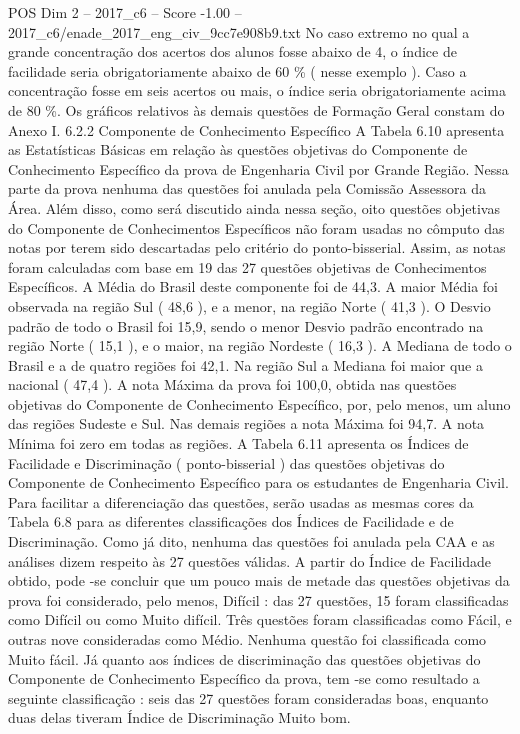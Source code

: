\begin{textsample}{POS Dim 2 – 2017\_c6 – Score -1.00 – 2017\_c6/enade\_2017\_eng\_civ\_9cc7e908b9.txt}
No caso extremo no qual a grande concentração dos acertos dos alunos fosse abaixo de 4, o índice de facilidade seria obrigatoriamente abaixo de 60 \% ( nesse exemplo ).
Caso a concentração fosse em seis acertos ou mais, o índice seria obrigatoriamente acima de 80 \%.
Os gráficos relativos às demais questões de Formação Geral constam do Anexo I. 6.2.2 Componente de Conhecimento Específico A Tabela 6.10 apresenta as Estatísticas Básicas em relação às questões objetivas do Componente de Conhecimento Específico da prova de Engenharia Civil por Grande Região.
Nessa parte da prova nenhuma das questões foi anulada pela Comissão Assessora da Área.
Além disso, como será discutido ainda nessa seção, oito questões objetivas do Componente de Conhecimentos Específicos não foram usadas no cômputo das notas por terem sido descartadas pelo critério do ponto-bisserial.
Assim, as notas foram calculadas com base em 19 das 27 questões objetivas de Conhecimentos Específicos.
A Média do Brasil deste componente foi de 44,3.
A maior Média foi observada na região Sul ( 48,6 ), e a menor, na região Norte ( 41,3 ).
O Desvio padrão de todo o Brasil foi 15,9, sendo o menor Desvio padrão encontrado na região Norte ( 15,1 ), e o maior, na região Nordeste ( 16,3 ).
A Mediana de todo o Brasil e a de quatro regiões foi 42,1.
Na região Sul a Mediana foi maior que a nacional ( 47,4 ).
A nota Máxima da prova foi 100,0, obtida nas questões objetivas do Componente de Conhecimento Específico, por, pelo menos, um aluno das regiões Sudeste e Sul.
Nas demais regiões a nota Máxima foi 94,7.
A nota Mínima foi zero em todas as regiões.
A Tabela 6.11 apresenta os Índices de Facilidade e Discriminação ( ponto-bisserial ) das questões objetivas do Componente de Conhecimento Específico para os estudantes de Engenharia Civil.
Para facilitar a diferenciação das questões, serão usadas as mesmas cores da Tabela 6.8 para as diferentes classificações dos Índices de Facilidade e de Discriminação.
Como já dito, nenhuma das questões foi anulada pela CAA e as análises dizem respeito às 27 questões válidas.
A partir do Índice de Facilidade obtido, pode -se concluir que um pouco mais de metade das questões objetivas da prova foi considerado, pelo menos, Difícil : das 27 questões, 15 foram classificadas como Difícil ou como Muito difícil.
Três questões foram classificadas como Fácil, e outras nove consideradas como Médio.
Nenhuma questão foi classificada como Muito fácil.
Já quanto aos índices de discriminação das questões objetivas do Componente de Conhecimento Específico da prova, tem -se como resultado a seguinte classificação : seis das 27 questões foram consideradas boas, enquanto duas delas tiveram Índice de Discriminação Muito bom.

\end{textsample}
